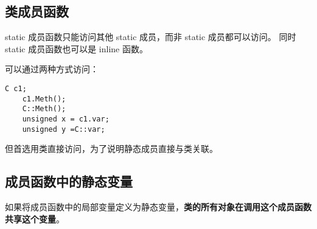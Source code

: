 \subsection{类成员函数}

static 成员函数只能访问其他 static 成员，而非 static 成员都可以访问。
同时 static 成员函数也可以是 inline 函数。

可以通过两种方式访问：
\begin{lstlisting}[frame=shadowbox]
    C c1;
    c1.Meth();
    C::Meth();
    unsigned x = c1.var;
    unsigned y =C::var;
\end{lstlisting}

但首选用类直接访问，为了说明静态成员直接与类关联。

\subsection{成员函数中的静态变量}

如果将成员函数中的局部变量定义为静态变量，\textbf{类的所有对象在调用这个成员函数共享这个变量}。


\newpage